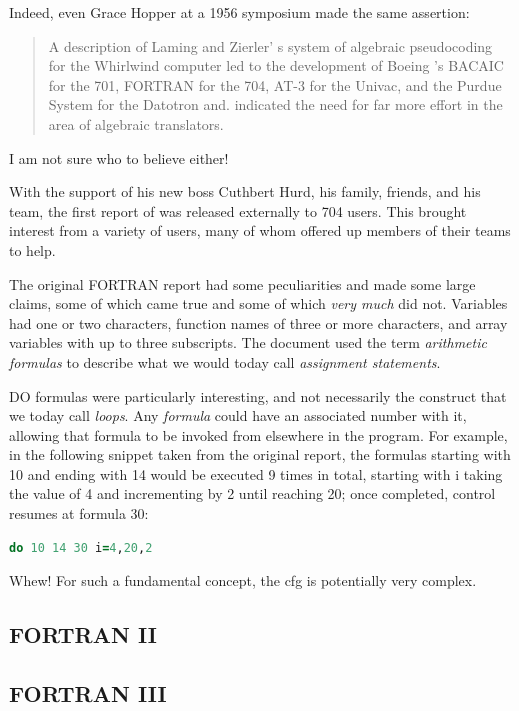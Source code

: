Indeed, even Grace Hopper at a 1956 symposium made the same assertion:

\begin{quotation}
	A description of Laming and Zierler' s system of algebraic pseudocoding for
	the Whirlwind computer led to the development of Boeing 's BACAIC for the 701,
	FORTRAN for the 704, AT-3 for the Univac, and the Purdue System for the Datotron and. indicated the need for far more effort in the area of algebraic
	translators.
	\cite{Knuth_TrabbPardo_1976_Early_Development}
\end{quotation}

I am not sure who to believe either!

With the support of his new boss Cuthbert Hurd, his family, friends, and his
team, the first report of \FTN{} was released externally to 704 users. This
brought interest from a variety of users, many of whom offered up members of
their teams to help.

The original FORTRAN report had some peculiarities and made some large claims,
some of which came true and some of which \textit{very much} did not.
Variables had one or two characters, function names of three or more characters,
and array variables with up to three subscripts.
The document used the term \textit{arithmetic formulas} to describe what
we would today call \textit{assignment statements}.

DO formulas were particularly interesting, and not necessarily the construct that we
today call \textit{loops}.
Any \textit{formula} could have an associated number with it, allowing that formula to be
invoked from elsewhere in the program.
For example, in the following snippet taken from the original report,
the formulas starting with 10 and ending with 14 would be executed
9 times in total, starting with i taking the value of 4 and incrementing by 2
until reaching 20; once completed, control resumes at formula 30:

\begin{lstlisting}[language=fortran,frame=single]
      do 10 14 30 i=4,20,2
\end{lstlisting}

Whew! For such a fundamental concept, the \gls{cfg} is potentially very complex.

\subsection{FORTRAN II}
\subsection{FORTRAN III}

